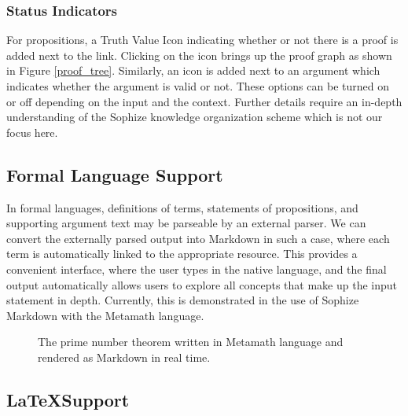 \documentclass[a4paper]{article}
\begin{document}
\subsubsection{Status Indicators}

For propositions, a Truth Value Icon indicating whether or not there is a proof is added next to the link. Clicking on the icon brings up the proof graph as shown in Figure \ref{proof_tree}. Similarly, an icon is added next to an argument which indicates whether the argument is valid or not. These options can be turned on or off depending on the input and the context. Further details require an in-depth understanding of the Sophize knowledge organization scheme which is not our focus here.

\subsection{Formal Language Support}

In formal languages, definitions of terms, statements of propositions, and supporting argument text may be parseable by an external parser. We can convert the externally parsed output into Markdown in such a case, where each term is automatically linked to the appropriate resource. This provides a convenient interface, where the user types in the native language, and the final output automatically allows users to explore all concepts that make up the input statement in depth. Currently, this is demonstrated in the use of Sophize Markdown with the Metamath language.

\begin{figure}[ht]
\begin{center}
\caption{The prime number theorem written in Metamath language and rendered as Markdown in real time.}
\label{formal}
\end{center}
\end{figure}

\subsection{\LaTeX\space Support}
\end{document}
